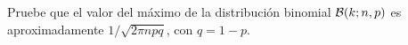 \begin{statement}{20}
  Pruebe que el valor del m\'aximo de la distribuci\'on binomial $\mathcal{B}(k; n, p)$ es
  aproximadamente $1 / \sqrt{2 \pi n p q}$, con $q = 1 - p$.
\end{statement}